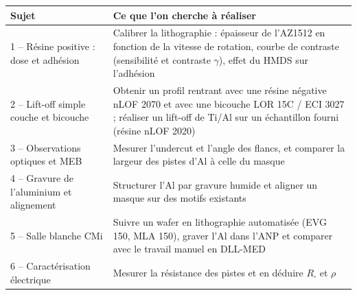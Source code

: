 \begin{center}
\small
{}
\begin{tabularx}{\linewidth}{@{}p{4.6cm}X@{}}
  \toprule
  \textbf{Sujet} & \textbf{Ce que l'on cherche à réaliser} \\
  \midrule
  1 -- Résine positive : dose et adhésion & Calibrer la lithographie : épaisseur de l'AZ1512 en fonction de la vitesse de rotation, courbe de contraste (sensibilité et contraste $\gamma$), effet du HMDS sur l'adhésion \\
  2 -- Lift-off simple couche et bicouche & Obtenir un profil rentrant avec une résine négative nLOF 2070 et avec une bicouche LOR 15C / ECI 3027 ; réaliser un lift-off de Ti/Al sur un échantillon fourni (résine nLOF 2020) \\
  3 -- Observations optiques et MEB & Mesurer l'undercut et l'angle des flancs, et comparer la largeur des pistes d'Al à celle du masque \\
  4 -- Gravure de l'aluminium et alignement & Structurer l'Al par gravure humide et aligner un masque sur des motifs existants \\
  5 -- Salle blanche CMi & Suivre un wafer en lithographie automatisée (EVG 150, MLA 150), graver l'Al dans l'ANP et comparer avec le travail manuel en DLL-MED \\
  6 -- Caractérisation électrique & Mesurer la résistance des pistes et en déduire $R_\square$ et $\rho$ \\
  \bottomrule
\end{tabularx}
\end{center}
